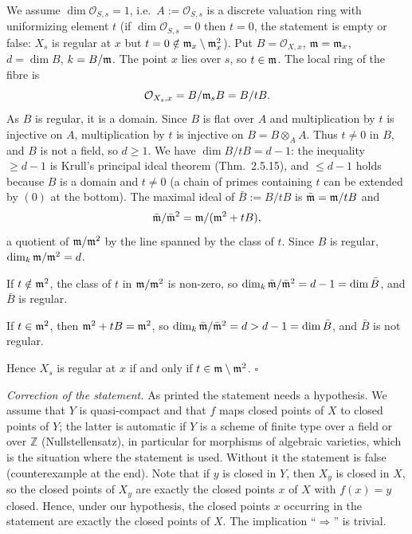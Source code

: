 \documentclass[11pt]{article}
\begin{document}
\pf
We assume $\dim\mathcal O_{S,s}=1$, i.e.\ $A:=\mathcal O_{S,s}$ is a discrete valuation ring with uniformizing element $t$ (if $\dim\mathcal O_{S,s}=0$ then $t=0$, the statement is empty or false: $X_s$ is regular at $x$ but $t=0\notin\mathfrak m_x\setminus\mathfrak m_x^2$). Put $B=\mathcal O_{X,x}$, $\mathfrak m=\mathfrak m_x$, $d=\dim B$, $k=B/\mathfrak m$. The point $x$ lies over $s$, so $t\in\mathfrak m$. The local ring of the fibre is
\[ \mathcal O_{X_s,x}=B/\mathfrak m_sB=B/tB. \]
As $B$ is regular, it is a domain. Since $B$ is flat over $A$ and multiplication by $t$ is injective on $A$, multiplication by $t$ is injective on $B=B\otimes_AA$. Thus $t\neq0$ in $B$, and $B$ is not a field, so $d\ge1$. We have $\dim B/tB=d-1$: the inequality $\ge d-1$ is Krull's principal ideal theorem (Thm.~2.5.15), and $\le d-1$ holds because $B$ is a domain and $t\neq0$ (a chain of primes containing $t$ can be extended by $(0)$ at the bottom). The maximal ideal of $\bar B:=B/tB$ is $\bar{\mathfrak m}=\mathfrak m/tB$ and
\[ \bar{\mathfrak m}/\bar{\mathfrak m}^2=\mathfrak m/(\mathfrak m^2+tB), \]
a quotient of $\mathfrak m/\mathfrak m^2$ by the line spanned by the class of $t$. Since $B$ is regular, $\dim_k\mathfrak m/\mathfrak m^2=d$.

If $t\notin\mathfrak m^2$, the class of $t$ in $\mathfrak m/\mathfrak m^2$ is non-zero, so $\dim_k\bar{\mathfrak m}/\bar{\mathfrak m}^2=d-1=\dim\bar B$, and $\bar B$ is regular.

If $t\in\mathfrak m^2$, then $\mathfrak m^2+tB=\mathfrak m^2$, so $\dim_k\bar{\mathfrak m}/\bar{\mathfrak m}^2=d>d-1=\dim\bar B$, and $\bar B$ is not regular.

Hence $X_s$ is regular at $x$ if and only if $t\in\mathfrak m\setminus\mathfrak m^2$. \hfill$\square$

\pf
\emph{Correction of the statement.} As printed the statement needs a hypothesis. We assume that $Y$ is quasi-compact and that $f$ maps closed points of $X$ to closed points of $Y$; the latter is automatic if $Y$ is a scheme of finite type over a field or over $\mathbb Z$ (Nullstellensatz), in particular for morphisms of algebraic varieties, which is the situation where the statement is used. Without it the statement is false (counterexample at the end). Note that if $y$ is closed in $Y$, then $X_y$ is closed in $X$, so the closed points of $X_y$ are exactly the closed points $x$ of $X$ with $f(x)=y$ closed. Hence, under our hypothesis, the closed points $x$ occurring in the statement are exactly the closed points of $X$. The implication ``$\Rightarrow$'' is trivial.
\end{document}
